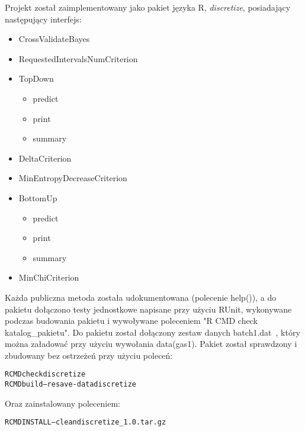 Projekt został zaimplementowany jako pakiet języka R, \emph{discretize}, posiadający następujący interfejs:
\begin{itemize}
\item{CrossValidateBayes}
\item{RequestedIntervalsNumCriterion}
\item{TopDown}
	\begin{itemize}
	\item{predict}
	\item{print}
	\item{summary}
	\end{itemize}
\item{DeltaCriterion}
\item{MinEntropyDecreaseCriterion}
\item{BottomUp}
	\begin{itemize}
	\item{predict}
	\item{print}
	\item{summary}
	\end{itemize}
\item{MinChiCriterion}
\end{itemize}

\noindent Każda publiczna metoda została udokumentowana (polecenie help()), a do pakietu dołączono testy jednostkowe napisane przy użyciu RUnit, wykonywane podczas budowania pakietu i wywoływane poleceniem "R CMD check katalog\_pakietu". Do pakietu został dołączony zestaw danych batch1.dat~\cite{Gas:2012}, który można załadować przy użyciu wywołania data(gas1). Pakiet został sprawdzony i zbudowany bez ostrzeżeń przy użyciu poleceń:
\begin{alltt}
R CMD check discretize
R CMD build --resave-data discretize
\end{alltt}
\noindent Oraz zainstalowany poleceniem:
\begin{alltt}
R CMD INSTALL --clean discretize_1.0.tar.gz
\end{alltt}
